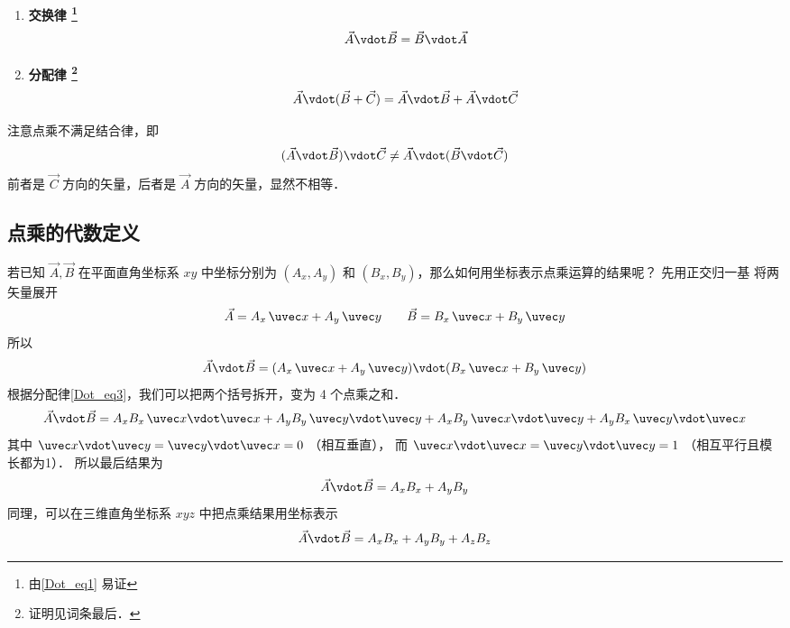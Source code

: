 \begin{enumerate}
\item \textbf{交换律 \footnote{由\autoref{Dot_eq1} 易证}}
\begin{equation}
\vec A \vdot \vec B = \vec B \vdot \vec A
\end{equation}

\item \textbf{分配律 \footnote{证明见词条最后．}}
\begin{equation}\label{Dot_eq3}
\vec A \vdot (\vec B + \vec C) = \vec A \vdot \vec B + \vec A \vdot \vec C
\end{equation}
\end{enumerate}

注意点乘不满足结合律，即
\begin{equation}
(\vec A \vdot \vec B) \vdot \vec C \ne  \vec A \vdot (\vec B \vdot \vec C)
\end{equation}
前者是 $\vec C$ 方向的矢量，后者是 $\vec A$ 方向的矢量，显然不相等．

\subsection{点乘的代数定义}

若已知 $\vec A, \vec B$ 在平面直角坐标系 $xy$ 中坐标分别为 $(A_x, A_y)$ 和  $(B_x, B_y)$，那么如何用坐标表示点乘运算的结果呢？ 先用正交归一基 将两矢量展开 %
\begin{equation}
\vec A = A_x \,\uvec x + A_y \,\uvec y \qquad \vec B = B_x \,\uvec x + B_y \,\uvec y
\end{equation}
所以
\begin{equation}
\vec A \vdot \vec B = (A_x \,\uvec x + A_y \,\uvec y) \vdot (B_x \,\uvec x + B_y \,\uvec y)
\end{equation}
根据分配律\autoref{Dot_eq3}，我们可以把两个括号拆开，变为 4 个点乘之和． 
\begin{equation}
\vec A \vdot \vec B = A_x B_x \,\uvec x \vdot \uvec x + A_y B_y \,\uvec y \vdot \uvec y + A_x B_y \,\uvec x \vdot \uvec y + A_y B_x \,\uvec y \vdot \uvec x
\end{equation}
其中 $\uvec x \vdot \uvec y = \uvec y \vdot \uvec x = 0$ （相互垂直）， 而 $\uvec x \vdot \uvec x = \uvec y \vdot \uvec y = 1$ （相互平行且模长都为1）． 所以最后结果为
\begin{equation}
\vec A \vdot \vec B = A_x B_x + A_y B_y
\end{equation}
同理，可以在三维直角坐标系 $xyz$ 中把点乘结果用坐标表示
\begin{equation}
\vec A \vdot \vec B = A_x B_x + A_y B_y + A_z B_z	
\end{equation}

